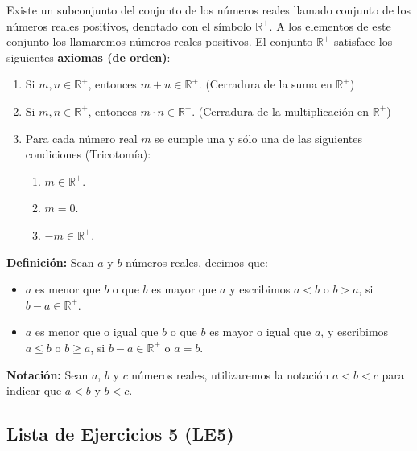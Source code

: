 \documentclass[11pt]{article}
\newcommand{\R}{\mathbb{R}}
\begin{document}
Existe un subconjunto del conjunto de los números reales llamado conjunto de los números reales positivos, denotado con el símbolo $\R^+$. A los elementos de este conjunto los llamaremos números reales positivos. El conjunto $\R^+$ satisface los siguientes \textbf{axiomas (de orden)}:
%
\begin{enumerate}[label=O\arabic*)]
\item Si $m, n \in \R^+$, entonces $m + n \in \R^+$. (Cerradura de la suma en $\R^+$)
\item Si $m, n \in \R^+$, entonces $m \cdot n \in \R^+$. (Cerradura de la multiplicación en $\R^+$)
\item Para cada número real $m$ se cumple una y sólo una de las siguientes condiciones (Tricotomía):
    \begin{enumerate}[label=\roman*)]
    \item $m \in \R^+$.
    \item $m = 0$.
    \item $-m \in \R^+$.\
    \end{enumerate}
\end{enumerate}

\textbf{Definición:} Sean $a$ y $b$ números reales, decimos que:%
%
\begin{itemize}
    \item $a$ es menor que $b$ o que $b$ es mayor que $a$ y escribimos $a<b$ o $b>a$, si $b-a \in \R^+$.
    \item $a$ es menor que o igual que $b$ o que $b$ es mayor o igual que $a$, y escribimos $a \leq b$ o $b \geq a$, si $b - a \in \R^+$ o $a = b$.
\end{itemize}

\textbf{Notación:} Sean $a$, $b$ y $c$ números reales, utilizaremos la notación $a<b<c$ para indicar que $a<b$ y $b<c$.

\subsection*{Lista de Ejercicios 5 (LE5)}
\end{document}
